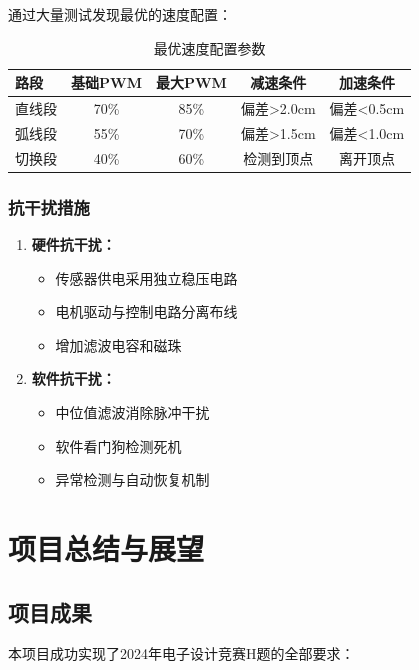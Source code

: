 \documentclass[UTF8]{ctexart}
\begin{document}
通过大量测试发现最优的速度配置：

\begin{table}[H]
    \centering
    \caption{最优速度配置参数}
    \label{tab:optimal_speed}
    \begin{tabular}{lcccc}
        \toprule
        路段 & 基础PWM & 最大PWM & 减速条件 & 加速条件 \\
        \midrule
        直线段 & 70\% & 85\% & 偏差>2.0cm & 偏差<0.5cm \\
        弧线段 & 55\% & 70\% & 偏差>1.5cm & 偏差<1.0cm \\
        切换段 & 40\% & 60\% & 检测到顶点 & 离开顶点 \\
        \bottomrule
    \end{tabular}
\end{table}

\subsubsection{抗干扰措施}

\begin{enumerate}
    \item \textbf{硬件抗干扰：}
    \begin{itemize}
        \item 传感器供电采用独立稳压电路
        \item 电机驱动与控制电路分离布线
        \item 增加滤波电容和磁珠
    \end{itemize}
    
    \item \textbf{软件抗干扰：}
    \begin{itemize}
        \item 中位值滤波消除脉冲干扰
        \item 软件看门狗检测死机
        \item 异常检测与自动恢复机制
    \end{itemize}
\end{enumerate}

\section{项目总结与展望}

\subsection{项目成果}

本项目成功实现了2024年电子设计竞赛H题的全部要求：
\end{document}
